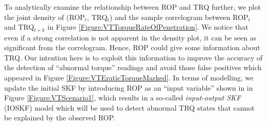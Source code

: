 To analytically examine the relationship between ROP and TRQ further, we plot the joint density of (ROP$_t$, TRQ$_t$) and the sample correlogram between ROP$_t$ and TRQ$_{t+k}$ in Figure \ref{Figure:VTTorqueRateOfPenetration}. We notice that even if a strong correlation is not apparent in the density plot, it can be seen as significant from the correlogram. Hence, ROP could give some information about TRQ. Our intention here is to exploit this information to improve the accuracy of the detection of ``abnormal torque'' readings and avoid those false positives which appeared in Figure \ref{Figure:VTEraticTorqueMarked}.  In terms of modelling, we update the initial SKF by introducing ROP as an ``input variable'' shown in  in Figure \ref{Figure:VTScenario1}, which results in a so-called \textit{input-output SKF} (IOSKF) model which will be used to detect  abnormal TRQ states that cannot be explained by the observed ROP.

